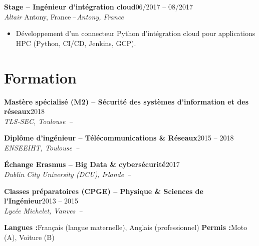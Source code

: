 \documentclass[10pt,a4paper]{article}
\newcommand{\cventry}[4]{%
  \textbf{#1}\hfill\textcolor{muted}{\small #4}\\[0.5pt]%
  \textcolor{accent}{\itshape #2}%
  \ifx\relax#3\relax\else\textcolor{muted}{\itshape\,--\,#3}\fi\par\vspace{1.5pt}%
}
\begin{document}
\cventry{Stage -- Ingénieur d'intégration cloud}{Altair}{Antony, France}{06/2017 -- 08/2017}
\begin{itemize}
  \item Développement d'un connecteur Python d'intégration cloud pour applications HPC (Python, CI/CD, Jenkins, GCP).
\end{itemize}

\section{Formation}

\cventry{Mastère spécialisé (M2) -- Sécurité des systèmes d'information et des réseaux}{TLS-SEC, Toulouse}{}{2018}
\par\vspace{2pt}

\cventry{Diplôme d'ingénieur -- Télécommunications \& Réseaux}{ENSEEIHT, Toulouse}{}{2015 -- 2018}
\par\vspace{2pt}

\cventry{Échange Erasmus -- Big Data \& cybersécurité}{Dublin City University (DCU), Irlande}{}{2017}
\par\vspace{2pt}

\cventry{Classes préparatoires (CPGE) -- Physique \& Sciences de l'Ingénieur}{Lycée Michelet, Vanves}{}{2013 -- 2015}

\vspace{4pt}
{\color{accent}\titlerule[0.8pt]}\vspace{4pt}
\textbf{\color{accent}Langues :}\enspace Français (langue maternelle), Anglais (professionnel)%
\hfill
\textbf{\color{accent}Permis :}\enspace Moto (A), Voiture (B)
\end{document}
